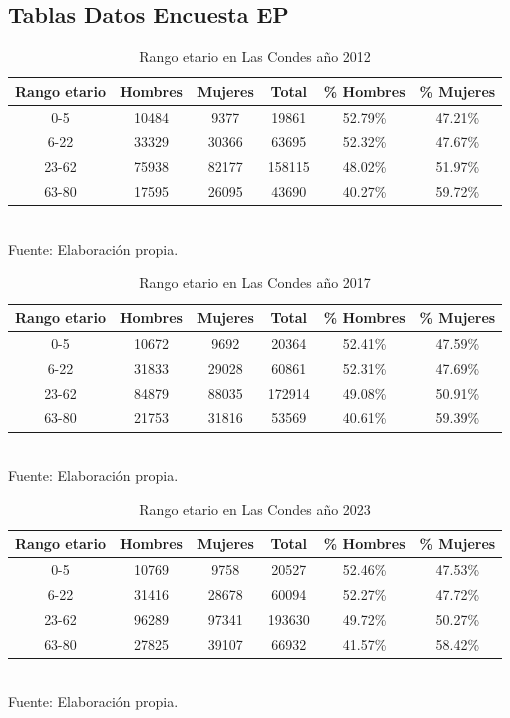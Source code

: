 \documentclass[12pt]{article} %
\begin{document}
\subsection{Tablas Datos Encuesta EP}

\begin{table}[H]
    \centering
    \caption{Rango etario en Las Condes año 2012}
    \begin{tabular}{|c|c|c|c|c|c|}
    \hline
    \textbf{Rango etario} & \textbf{Hombres} & \textbf{Mujeres} & \textbf{Total} & \textbf{\% Hombres} & \textbf{\% Mujeres} \\ \hline
    0-5 & 10484 & 9377 & 19861 & 52.79\% & 47.21\% \\ \hline
    6-22 & 33329 & 30366 & 63695 & 52.32\% & 47.67\% \\ \hline
    23-62 & 75938 & 82177 & 158115 & 48.02\% & 51.97\% \\ \hline
    63-80 & 17595 & 26095 & 43690 & 40.27\% & 59.72\% \\ \hline
    \end{tabular}
    \label{Cuadro 4}
    \\Fuente: Elaboración propia.
\end{table}

\begin{table}[H]
    \centering
    \caption{Rango etario en Las Condes año 2017}
    \begin{tabular}{|c|c|c|c|c|c|}
    \hline
    \textbf{Rango etario} & \textbf{Hombres} & \textbf{Mujeres} & \textbf{Total} & \textbf{\% Hombres} & \textbf{\% Mujeres} \\ \hline
    0-5 & 10672 & 9692 & 20364 & 52.41\% & 47.59\% \\ \hline
    6-22 & 31833 & 29028 & 60861 & 52.31\% & 47.69\% \\ \hline
    23-62 & 84879 & 88035 & 172914 & 49.08\% & 50.91\% \\ \hline
    63-80 & 21753 & 31816 & 53569 & 40.61\% & 59.39\% \\ \hline
    \end{tabular}
    \label{Cuadro 5}
    \\Fuente: Elaboración propia.
\end{table}

\begin{table}[H]
    \centering
    \caption{Rango etario en Las Condes año 2023}
    \begin{tabular}{|c|c|c|c|c|c|}
    \hline
    \textbf{Rango etario} & \textbf{Hombres} & \textbf{Mujeres} & \textbf{Total} & \textbf{\% Hombres} & \textbf{\% Mujeres} \\ \hline
    0-5 & 10769 & 9758 & 20527 & 52.46\% & 47.53\% \\ \hline
    6-22 & 31416 & 28678 & 60094 & 52.27\% & 47.72\% \\ \hline
    23-62 & 96289 & 97341 & 193630 & 49.72\% & 50.27\% \\ \hline
    63-80 & 27825 & 39107 & 66932 & 41.57\% & 58.42\% \\ \hline
    \end{tabular}
    \label{Cuadro 6}
    \\Fuente: Elaboración propia.
\end{table}
\end{document}
